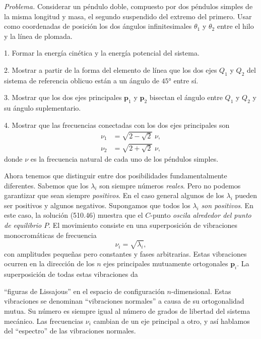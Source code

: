 \documentclass[12pt,a4paper]{book}
\newcommand{\vect}[1]{\mathbf{#1}}
\begin{document}
\textit{Problema.} Considerar un péndulo doble, compuesto por dos péndulos simples de la misma longitud y masa, el segundo suspendido del extremo del primero. Usar como coordenadas de posición los dos ángulos infinitesimales $\theta_1$ y $\theta_2$ entre el hilo y la línea de plomada.

1. Formar la energía cinética y la energía potencial del sistema.

2. Mostrar a partir de la forma del elemento de línea que los dos ejes $Q_1$ y $Q_2$ del sistema de referencia oblicuo están a un ángulo de $45°$ entre sí.

3. Mostrar que los dos ejes principales $\vect{p}_1$ y $\vect{p}_2$ bisectan el ángulo entre $Q_1$ y $Q_2$ y su ángulo suplementario.

4. Mostrar que las frecuencias conectadas con los dos ejes principales son
\begin{align*}
\nu_1 &= \sqrt{2 - \sqrt{2}}\;\nu, \\
\nu_2 &= \sqrt{2 + \sqrt{2}}\;\nu,
\end{align*}
donde $\nu$ es la frecuencia natural de cada uno de los péndulos simples.


Ahora tenemos que distinguir entre dos posibilidades fundamentalmente diferentes. Sabemos que los $\lambda_i$ son siempre números \textit{reales}. Pero no podemos garantizar que sean siempre \textit{positivos}. En el caso general algunos de los $\lambda_i$ pueden ser positivos y algunos negativos. Supongamos que todos los $\lambda_i$ \textit{son positivos}. En este caso, la solución (510.46) muestra que el $C$-punto \textit{oscila alrededor del punto de equilibrio $P$}. El movimiento consiste en una superposición de vibraciones monocromáticas de frecuencia
\begin{equation}
\nu_i = \sqrt{\lambda_i}, \tag{510.47}
\end{equation}
con amplitudes pequeñas pero constantes y fases arbitrarias. Estas vibraciones ocurren en la dirección de los $n$ ejes principales mutuamente ortogonales $\vect{p}_i$. La superposición de todas estas vibraciones da

``figuras de Lissajous'' en el espacio de configuración $n$-dimensional. Estas vibraciones se denominan ``vibraciones normales'' a causa de su ortogonalidad mutua. Su número es siempre igual al número de grados de libertad del sistema mecánico. Las frecuencias $\nu_i$ cambian de un eje principal a otro, y así hablamos del ``espectro'' de las vibraciones normales.
\end{document}
